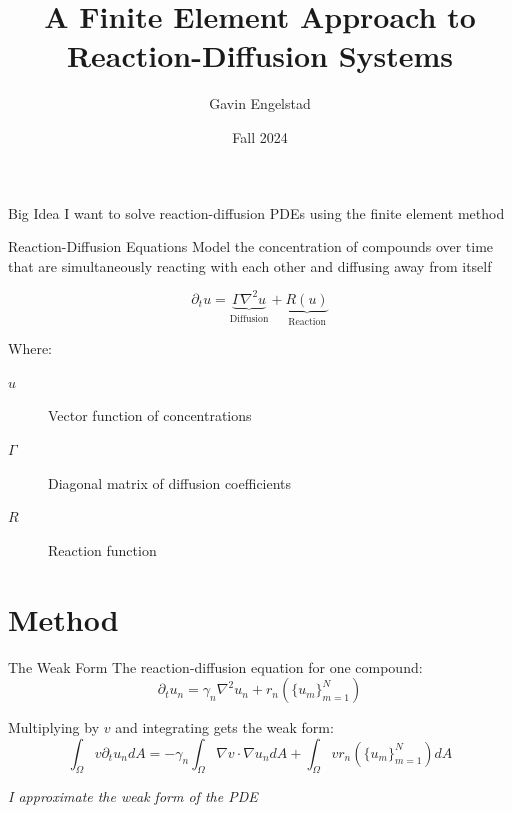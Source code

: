 \documentclass{beamer}
\title{A Finite Element Approach to Reaction-Diffusion Systems}
\author{Gavin Engelstad}
\date{Fall 2024}
\institute{Math 494: Partial Differential Equations}
\begin{document}
\maketitle


\begin{frame}{Big Idea}
    \centering
    I want to solve \alert{reaction-diffusion} PDEs using the \alert{finite element method}
\end{frame}

\begin{frame}{Reaction-Diffusion Equations}
    Model the concentration of compounds over time that are simultaneously \alert{reacting} with each other and \alert{diffusing} away from itself

    \[
        \partial_t u = \underbrace{\Gamma \nabla^2 u}_{\text{Diffusion}} + \underbrace{R (u)}_{\text{Reaction}}
    \]

    {\scriptsize Where:
    \begin{description}
        \item[$u$] Vector function of concentrations
        \item[$\Gamma$] Diagonal matrix of diffusion coefficients
        \item[$R$] Reaction function
    \end{description}}
\end{frame}


\section{Method}

\begin{frame}{The Weak Form}
    The reaction-diffusion equation for one compound:
    \[
        \partial_t u_n = \gamma_n \nabla^2 u_n + r_n\left(\{u_m\}_{m = 1}^N\right)
    \]

    Multiplying by $v$ and integrating gets the \alert{weak form}:
    \[
        \int_\Omega v \partial_t u_n dA = -\gamma_n \int_\Omega \nabla v \cdot \nabla u_n dA + \int_\Omega v r_n\left(\{u_m\}_{m = 1}^N\right) dA
    \]

    \begin{center}
        \emph{I approximate the weak form of the PDE}
    \end{center}
\end{frame}
\end{document}
